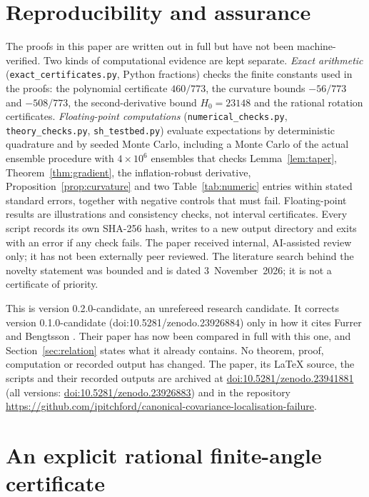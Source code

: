 \documentclass[11pt,a4paper]{article}
\numberwithin{equation}{section}
\theoremstyle{remark}\newtheorem{remark}[theorem]{Remark}
\begin{document}
\section*{Reproducibility and assurance}

The proofs in this paper are written out in full but have not been machine-verified. Two kinds
of computational evidence are kept separate. \emph{Exact arithmetic}
(\texttt{exact\_certificates.py}, Python fractions) checks the finite constants used in the
proofs: the polynomial certificate \(460/773\), the curvature bounds \(-56/773\) and \(-508/773\),
the second-derivative bound \(H_0=23148\) and the rational rotation certificates.
\emph{Floating-point computations} (\texttt{numerical\_checks.py}, \texttt{theory\_checks.py},
\texttt{sh\_testbed.py}) evaluate expectations by deterministic quadrature and by seeded Monte
Carlo, including a Monte Carlo of the actual ensemble procedure with \(4\times10^6\) ensembles that
checks Lemma~\ref{lem:taper}, Theorem~\ref{thm:gradient}, the inflation-robust derivative,
Proposition~\ref{prop:curvature} and two Table~\ref{tab:numeric} entries within stated standard errors, together with negative controls that
must fail. Floating-point results are illustrations and consistency checks, not interval
certificates. Every script records its own SHA-256 hash, writes to a new output directory and
exits with an error if any check fails. The paper received internal, AI-assisted review only; it
has not been externally peer reviewed. The literature search behind the novelty statement was
bounded and is dated 3~November~2026; it is not a certificate of priority.

This is version 0.2.0-candidate, an unrefereed research candidate. It corrects version
0.1.0-candidate (doi:10.5281/zenodo.23926884) only in how it cites Furrer and Bengtsson
\cite{FurrerBengtsson2007}. Their paper has now been compared in full with this one, and
Section~\ref{sec:relation} states what it already contains. No theorem, proof, computation or
recorded output has changed. The paper, its \LaTeX{} source, the
scripts and their recorded outputs are archived at
\href{https://doi.org/10.5281/zenodo.23941881}{doi:10.5281/zenodo.23941881} (all versions:
\href{https://doi.org/10.5281/zenodo.23926883}{doi:10.5281/zenodo.23926883}) and in the repository\newline
\url{https://github.com/ipitchford/canonical-covariance-localisation-failure}.

\appendix
\section{An explicit rational finite-angle certificate}\label{app:rational}
\end{document}
